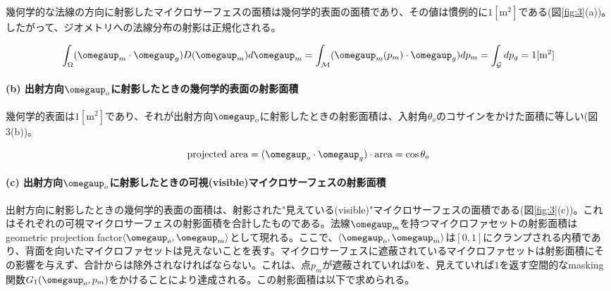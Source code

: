 \documentclass[a4j,xelatex,ja=standard]{bxjsarticle}
\begin{document}
幾何学的な法線の方向に射影したマイクロサーフェスの面積は幾何学的表面の面積であり、その値は慣例的に$1 [\text{m}^2]$である(図\ref{fig:3}(a))。したがって、ジオメトリへの法線分布の射影は正規化される。

\begin{equation}
    \int_\Omega (\boldsymbol{\omegaup}_m \cdot \boldsymbol{\omegaup}_g) D(\boldsymbol{\omegaup}_m) d\boldsymbol{\omegaup}_m = \int_\mathcal{M} (\boldsymbol{\omegaup}_m(p_m) \cdot \boldsymbol{\omegaup}_g) dp_m = \int_\mathcal{G} dp_g = 1 [\text{m}^2]
    \label{eq:9}
\end{equation}

\paragraph{(b) 出射方向$\boldsymbol{\omegaup}_o$に射影したときの幾何学的表面の射影面積}

幾何学的表面は$1 [\text{m}^2]$であり、それが出射方向$\boldsymbol{\omegaup}_o$に射影したときの射影面積は、入射角$\theta_o$のコサインをかけた面積に等しい(図3(b))。

\begin{equation}
    \text{projected area} = (\boldsymbol{\omegaup}_o \cdot \boldsymbol{\omegaup}_g) \cdot \text{area} = \cos \theta_o
    \label{eq:10}
\end{equation}

\paragraph{(c) 出射方向$\boldsymbol{\omegaup}_o$に射影したときの可視(visible)マイクロサーフェスの射影面積}

出射方向に射影したときの幾何学的表面の面積は、射影された"見えている(visible)"マイクロサーフェスの面積である(図\ref{fig:3}(c))。これはそれぞれの可視マイクロサーフェスの射影面積を合計したものである。法線$\boldsymbol{\omegaup}_m$を持つマイクロファセットの射影面積はgeometric projection factor$\langle \boldsymbol{\omegaup}_o, \boldsymbol{\omegaup}_m \rangle$として現れる。ここで、$\langle \boldsymbol{\omegaup}_o, \boldsymbol{\omegaup}_m \rangle$は$[0, 1]$にクランプされる内積であり、背面を向いたマイクロファセットは見えないことを表す。マイクロサーフェスに遮蔽されているマイクロファセットは射影面積にその影響を与えず、合計からは除外されなければならない。これは、点$p_m$が遮蔽されていれば$0$を、見えていれば$1$を返す空間的なmasking関数$G_1(\boldsymbol{\omegaup}_o, p_m)$をかけることにより達成される。この射影面積は以下で求められる。
\end{document}
